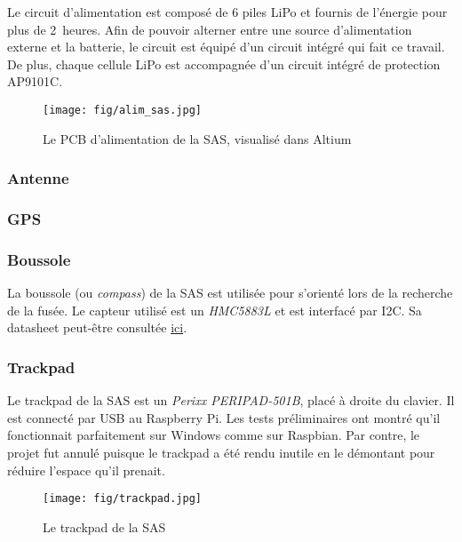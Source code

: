 Le circuit d'alimentation est composé de 6 piles LiPo et fournis de l'énergie
pour plus de 2~heures. Afin de pouvoir alterner entre une source d'alimentation
externe et la batterie, le circuit est équipé d'un circuit intégré qui fait ce
travail. De plus, chaque cellule LiPo est accompagnée d'un circuit intégré de
protection AP9101C.

\begin{figure}[H]
	\center
	\texttt{[image: fig/alim\_sas.jpg]}
	\caption{Le PCB d'alimentation de la SAS, visualisé dans Altium}
	\label{f:alim_sas}
\end{figure}

\subsubsection{Antenne}



\subsubsection{GPS}



\subsubsection{Boussole}

La boussole (ou \textit{compass}) de la SAS est utilisée pour s'orienté lors de
la recherche de la fusée. Le capteur utilisé est un \textit{HMC5883L} et est
interfacé par I2C. Sa datasheet peut-être consultée
\href{https://cdn-shop.adafruit.com/datasheets/HMC5883L_3-Axis_Digital_Compass_IC.pdf}{ici}.

\subsubsection{Trackpad}

Le trackpad de la SAS est un \textit{Perixx PERIPAD-501B}, placé à droite du
clavier. Il est connecté par USB au Raspberry Pi. Les tests préliminaires ont
montré qu'il fonctionnait parfaitement sur Windows comme sur Raspbian. Par
contre, le projet fut annulé puisque le trackpad a été rendu inutile en le
démontant pour réduire l'espace qu'il prenait.

\begin{figure}[H]
	\center
	\texttt{[image: fig/trackpad.jpg]}
	\caption{Le trackpad de la SAS}
	\label{f:trackpad}
\end{figure}

